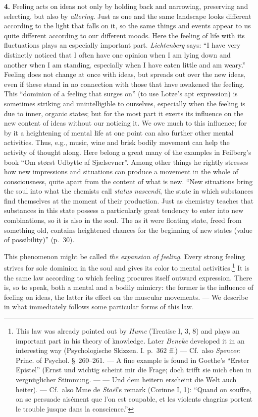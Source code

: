 \documentclass[12pt,a4paper]{book}
\newcommand{\opage}[1]{\marginnote{\footnotesize\textit{[#1]}}}
\begin{document}
\textbf{4.} Feeling acts on ideas not only by holding back and
narrowing, preserving and selecting, but also by \emph{altering}. Just
as one and the same landscape looks different according to the light
that falls on it, so the same things and events appear to us quite
different according to our different moods. Here the feeling of life
with its fluctuations plays an especially important part.
\emph{Lichtenberg} says: ``I have very distinctly noticed that I often
have one opinion when I am lying down and another when I am standing,
especially when I have eaten little and am weary.'' Feeling does not
change at once with ideas, but spreads out over the new ideas, even if
these stand in no connection with those that have awakened the feeling.
This ``dominion of a feeling that surges on'' (to use Lotze's apt
expression) is sometimes striking and unintelligible to ourselves,
especially when the feeling is due to inner, organic states; but for the
most part it exerts its influence on the new content of ideas without
our noticing it. We owe much to this influence; for by it a heightening
of mental life at one point can also further other mental activities.
Thus, e.g., music, wine and brisk bodily movement can help the activity
of thought along. Here belong a great many of the examples in Feilberg's
book ``Om størst Udbytte af Sjælsevner''. Among other things
\opage{358}he rightly stresses how new impressions and situations can
produce a movement in the whole of consciousness, quite apart from the
content of what is new. ``New situations bring the soul into what the
chemists call \textit{status nascendi}, the state in which substances
find themselves at the moment of their production. Just as chemistry
teaches that substances in this state possess a particularly great
tendency to enter into new combinations, so it is also in the soul. The
as it were floating state, freed from something old, contains
heightened chances for the beginning of new states (value of
possibility)'' (p.~30).

This phenomenon might be called \emph{the expansion of feeling}. Every
strong feeling strives for sole dominion in the soul and gives its color
to
mental activities.\footnote{This law was already pointed out by
\emph{Hume} (Treatise I, 3, 8) and plays an important part in his theory
of knowledge. Later \emph{Beneke} developed it in an interesting way
(Psychologische Skizzen. I. p.~362 ff.) --- Cf.\ also \emph{Spencer}:
Princ. of Psychol. \S~260--261. --- A fine example is found in Goethe's
``Erster Epistel'' (Ernst und wichtig scheint mir die Frage; doch trifft
sie mich eben in vergnüglicher Stimmung. --- --- Und dem heitern
erscheint die Welt auch heiter). --- Cf.\ also Mme de \emph{Staël}'s
remark (Corinne I, 1): ``Quand on souffre, on se persuade aisément que
l’on est coupable, et les violents chagrins portent le trouble jusque
dans la conscience.''} It is the same law according to which feeling
procures itself outward expression. There is, so to speak, both a
mental and a bodily mimicry: the former is the influence of feeling on
ideas, the latter its effect on the muscular movements. --- We describe
in what immediately follows some particular forms of this law.
\end{document}
